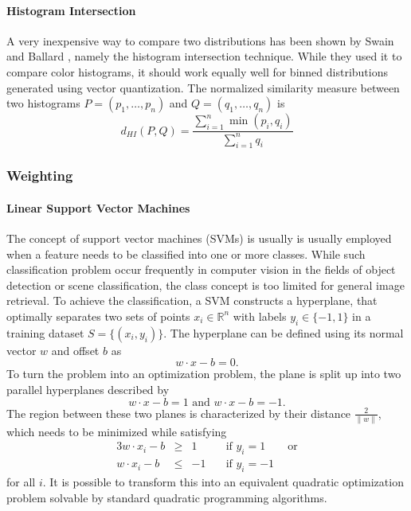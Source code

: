 \paragraph{Histogram Intersection}

A very inexpensive way to compare two distributions has been shown by Swain and
Ballard \autocite{swain_color_1991}, namely the histogram intersection
technique. While they used it to compare color histograms, it should work
equally well for binned distributions generated using vector quantization. The
normalized similarity measure between two histograms $P = (p_1, \dots, p_n)$
and $Q = (q_1, \dots, q_n)$ is
\begin{equation*}
    d_{HI}(P, Q) = \frac{\sum_{i=1}^n \min (p_i, q_i)}{\sum_{i=1}^n q_i}
\end{equation*}

\subsubsection{Weighting}

\paragraph{Linear Support Vector Machines}

The concept of support vector machines (SVMs) is usually is usually employed
when a feature needs to be classified into one or more classes. While such
classification problem occur frequently in computer vision in the fields of
object detection \autocite{pontil_support_1998} or scene classification, the
class concept is too limited for general image retrieval. To achieve the
classification, a SVM constructs a hyperplane, that optimally separates two
sets of points $x_i \in \mathbb{R}^n$ with labels $y_i \in \{-1, 1 \}$ in a
training dataset $S = \{ (x_i, y_i) \}$. The hyperplane can be defined using
its normal vector $w$ and offset $b$ as
\begin{equation*}
    w \cdot x - b = 0.
\end{equation*}
To turn the problem into an optimization problem, the plane is split up into
two parallel hyperplanes described by
\begin{equation*}
    w \cdot x - b = 1 \text{ and } w \cdot x - b = -1.
\end{equation*}
The region between these two planes is characterized by their distance
$\frac{2}{\| w \|}$, which needs to be minimized while satisfying
\begin{alignat*}{3}
    w \cdot x_i - b & \geq & 1 & \quad \text{if } y_i = 1 \qquad \text{or} \\
    w \cdot x_i - b & \leq & -1 & \quad \text{if } y_i = -1
\end{alignat*}
for all $i$. It is possible to transform this into an equivalent quadratic
optimization problem solvable by standard quadratic programming algorithms.

